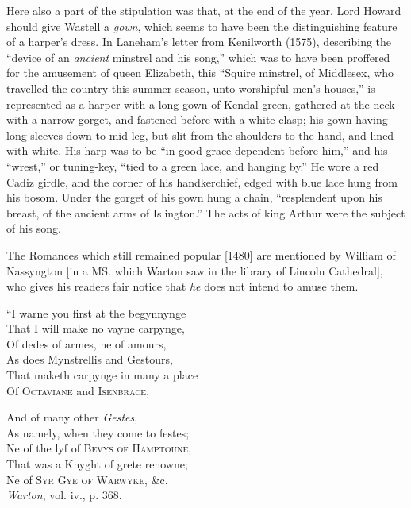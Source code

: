 Here also a part of the stipulation was that, at the end of the year, Lord
Howard should give Wastell a \textit{gown}, which seems to have been the distinguishing
feature of a harper’s dress. In Laneham’s letter from Kenilworth (1575),
describing the “device of an \textit{ancient} minstrel and his song,” which was to have
been proffered for the amusement of queen Elizabeth, this “Squire minstrel, of
Middlesex, who travelled the country this summer season, unto worshipful men’s
houses,” is represented as a harper with a long gown of Kendal green, gathered
at the neck with a narrow gorget, and fastened before with a white clasp; his
gown having long sleeves down to mid-leg, but slit from the shoulders to the
hand, and lined with white. His harp was to be “in good grace dependent before
him,” and his “wrest,” or tuning-key, “tied to a green lace, and hanging by.”
He wore a red Cadiz girdle, and the corner of his handkerchief, edged with blue
lace hung from his bosom. Under the gorget of his gown hung a chain, “resplendent
upon his breast, of the ancient arms of Islington.” The acts of king
Arthur were the subject of his song.

The Romances which still remained popular [1480] are mentioned by William
of Nassyngton [in a MS. which Warton saw in the library of Lincoln Cathedral],
who gives his readers fair notice that \textit{he} does not intend to amuse them.


\settowidth{\versewidth}{“I warne you first at the begynnynge}

\begin{dcverse}
“I warne you first at the begynnynge\\
That I will make no vayne carpynge,\\
Of dedes of armes, ne of amours,\\
As does Mynstrellis and Gestours,\\
That maketh carpynge in many a place\\
Of \textsc{Octaviane} and \textsc{Isenbrace},

And of many other \textit{Gestes},\\
As namely, when they come to festes;\\
Ne of the lyf of \textsc{Bevys of Hamptoune},\\
That was a Knyght of grete renowne;\\
Ne of \textsc{Syr Gye of Warwyke}, \&c.\\
\hfill\textit{Warton}, vol. iv., p. 368.
\end{dcverse}


